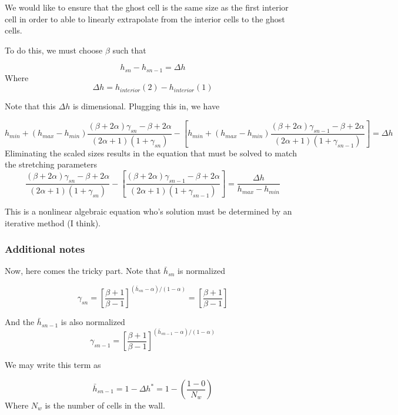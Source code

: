 \documentclass[11pt]{article}
\begin{document}
We would like to ensure that the ghost cell is the same size as the first interior cell in order to able to linearly extrapolate from the interior cells to the ghost cells.

To do this, we must choose $\beta$ such that

\begin{equation}
	h_{sn} - h_{sn-1} = \Delta h
\end{equation}
Where
\begin{equation}
	\Delta h = h_{interior}(2) - h_{interior}(1)
\end{equation}

Note that this $\Delta h$ is dimensional. Plugging this in, we have

\begin{equation}
	h_{min} + (h_{max}-h_{min}) \frac{(\beta+2\alpha)\gamma_{sn} - \beta + 2\alpha}{(2\alpha+1)(1+\gamma_{sn})}
	-
	\left[
	h_{min} + (h_{max}-h_{min}) \frac{(\beta+2\alpha)\gamma_{sn-1} - \beta + 2\alpha}{(2\alpha+1)(1+\gamma_{sn-1})}
	\right]
	=
	\Delta h
\end{equation}
Eliminating the scaled sizes results in the equation that must be solved to match the stretching parameters
\begin{equation}
	\boxed{
	\frac{(\beta+2\alpha)\gamma_{sn} - \beta + 2\alpha}{(2\alpha+1)(1+\gamma_{sn})}
	-
	\left[
	\frac{(\beta+2\alpha)\gamma_{sn-1} - \beta + 2\alpha}{(2\alpha+1)(1+\gamma_{sn-1})}
	\right]
	=
	\frac{\Delta h}{h_{max}-h_{min}}
	}
\end{equation}

This is a nonlinear algebraic equation who's solution must be determined by an iterative method (I think).

\subsubsection{Additional notes}
Now, here comes the tricky part.
Note that $\bar{h}_{sn}$ is normalized

\begin{equation}
	\gamma_{sn} = \left[
	\frac{\beta+1}{\beta-1}
	\right]^{(\bar{h}_{sn}-\alpha)/(1-\alpha)} =
	\left[
	\frac{\beta+1}{\beta-1}
	\right]
\end{equation}


And the $\bar{h}_{sn-1}$ is also normalized
\begin{equation}
	\gamma_{sn-1} = \left[
	\frac{\beta+1}{\beta-1}
	\right]^{(\bar{h}_{sn-1}-\alpha)/(1-\alpha)}
\end{equation}

We may write this term as

\begin{equation}
	\bar{h}_{sn-1} = 1 - \Delta h^* = 1 - \left( \frac{1-0}{N_w} \right)
\end{equation}
Where $N_w$ is the number of cells in the wall.
\end{document}

